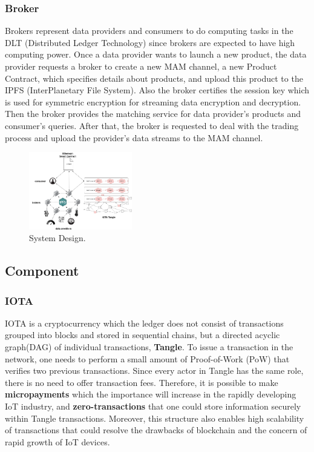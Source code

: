 \documentclass[journal,a4paper]{IEEEtran}
\begin{document}
\subsubsection{Broker}
Brokers represent data providers and consumers to do computing tasks in the DLT (Distributed Ledger Technology) since brokers are expected to have high computing power. Once a data provider wants to launch a new product, the data provider requests a broker to create a new MAM channel, a new Product Contract, which specifies details about products, and upload this product to the IPFS (InterPlanetary File System)\cite{IPFS}. Also the broker certifies the session key which is used for symmetric encryption for streaming data encryption and decryption. Then the broker provides the matching service for data provider’s products and consumer’s queries. After that, the broker is requested to deal with the trading process and upload the provider’s data streams to the MAM channel.

\begin{figure}[h]
	\centering
	\includegraphics[width=0.4\textwidth]{system_design}
	\caption{System Design.}
	\label{fig:system_design}
\end{figure}

\subsection{Component}
\subsubsection{IOTA}
IOTA\cite{IOTAwhitepaper} is a cryptocurrency which the ledger does not consist of transactions grouped into blocks and stored in sequential chains, but a directed acyclic graph(DAG) of individual transactions, \textbf{Tangle}. To issue a transaction in the network, one needs to perform a small amount of Proof-of-Work (PoW) that verifies two previous transactions. Since every actor in Tangle has the same role, there is no need to offer transaction fees. Therefore, it is possible to make \textbf{micropayments} which the importance will increase in the rapidly developing IoT industry, and \textbf{zero-transactions} that one could store information securely within Tangle transactions. Moreover, this structure also enables high scalability of transactions that could resolve the drawbacks of blockchain and the concern of rapid growth of IoT devices.
\end{document}
